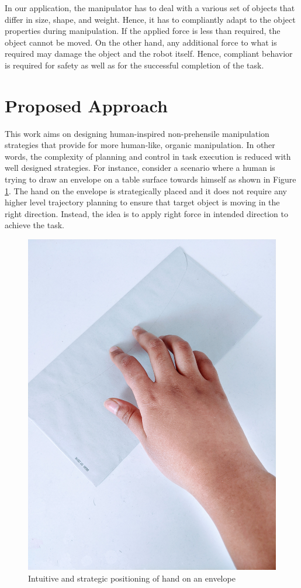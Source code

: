 \documentclass[rnd]{mas_proposal}
\begin{document}
In our application, the manipulator has to deal with a various set of objects that differ in size, shape, and weight. Hence, it has to compliantly adapt to the object properties during manipulation. If the applied force is less than required, the object cannot be moved. On the other hand, any additional force to what is required may damage the object and the robot itself. Hence, compliant behavior is required for safety as well as for the successful completion of the task.
\newpage
\section{Proposed Approach}
This work aims on designing human-inspired non-prehensile manipulation strategies that provide for more human-like, organic manipulation. In other words, the complexity of planning and control in task execution is reduced with well designed strategies. For instance, consider a scenario where a human is trying to draw an envelope on a table surface towards himself as shown in Figure \ref{env}. The hand on the envelope is strategically placed and it does not require any higher level trajectory planning to ensure that target object is moving in the right direction. Instead, the idea is to apply right force in intended direction to achieve the task. 




\begin{figure}[h] 
\begin{center}
\includegraphics[scale=0.05]{images/env.jpg}
\caption{Intuitive and strategic positioning of hand on an envelope}
\label{env}
\end{center}
\end{figure}
\end{document}
